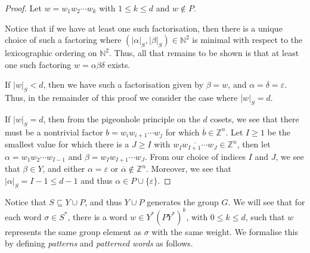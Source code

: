 \begin{proof}
Let $w = w_1 w_2 \cdots w_k$ with $1 \leqslant k \leqslant d$ and $w \notin P$.

Notice that if we have at least one such factorisation, then there is a unique choice of such a factoring where $(|\alpha|_S, |\beta|_S) \in \mathbb{N}^2$ is minimal with respect to the lexicographic ordering on $\mathbb{N}^2$.
Thus, all that remains to be shown is that at least one such factoring $w = \alpha\beta\delta$ exists.

If $|w|_S < d$, then we have such a factorisation given by $\beta = w$, and $\alpha = \delta = \varepsilon$.
Thus, in the remainder of this proof we consider the case where $|w|_S = d$.

If $|w|_S = d$, then from the pigeonhole principle on the $d$ cosets, we see that there must be a nontrivial factor $b = w_i w_{i+1} \cdots w_j$ for which $\overline{b} \in \mathbb{Z}^n$.
Let $I \geqslant 1$ be the smallest value for which there is a $J \geqslant I$ with $\overline{w_{I} w_{I+1} \cdots w_J} \in \mathbb{Z}^n$, then let $\alpha = w_1 w_2 \cdots w_{I-1}$ and $\beta = w_{I} w_{I+1} \cdots w_J$.
From our choice of indices $I$ and $J$, we see that $\beta \in Y$, and either $\alpha = \varepsilon$ or $\overline{\alpha} \notin \mathbb{Z}^n$.
Moreover, we see that $|\alpha|_S = I-1 \leqslant d - 1$ and thus $\alpha \in P\cup \{\varepsilon\}$.
\end{proof}

Notice that $S \subseteq Y \cup P$, and thus $Y \cup P$ generates the group $G$.
We will see that for each word $\sigma \in S^*$, there is a word $w \in Y^*(PY^*)^k$, with $0 \leqslant k \leqslant d$, such that $w$ represents the same group element as $\sigma$ with the same weight.
We formalise this by defining \emph{patterns} and \emph{patterned words} as follows.

